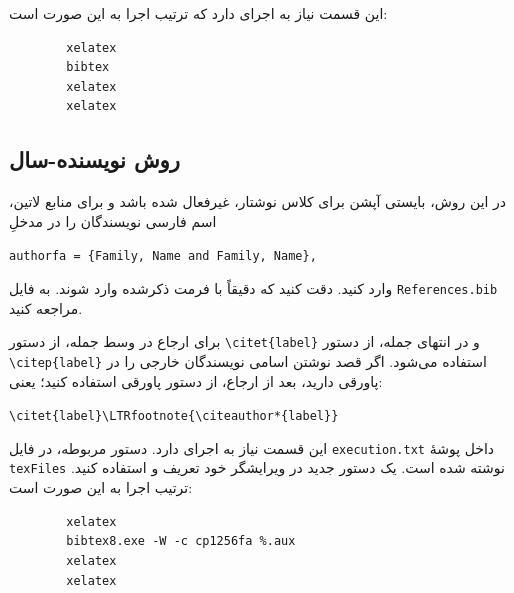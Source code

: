 این قسمت نیاز به اجرای
دارد که ترتیب اجرا به این صورت است:
\begin{latin}
	\begin{verbatim}
		xelatex
		bibtex
		xelatex
		xelatex
	\end{verbatim}
\end{latin}

\subsection{روش نویسنده-سال}
در این روش، بایستی آپشن
برای کلاس نوشتار، غیرفعال شده باشد و برای منابع لاتین، اسم فارسی نویسندگان را در مدخلِ
\begin{LTR}
	\verb|authorfa = {Family, Name and Family, Name},|
\end{LTR}\noindent
وارد کنید. دقت کنید که دقیقاً با فرمت ذکرشده وارد شوند. به فایل
\verb|References.bib|
مراجعه کنید.

برای ارجاع در وسط جمله، از دستور
\verb|\citet{label}|
و در انتهای جمله، از دستور
\verb|\citep{label}|
استفاده می‌شود. اگر قصد نوشتن اسامی نویسندگان خارجی را در پاورقی دارید،
بعد از ارجاع، از دستور پاورقی استفاده کنید؛ یعنی:
\begin{LTR}
	\verb|\citet{label}\LTRfootnote{\citeauthor*{label}}|
\end{LTR}

این قسمت نیاز به اجرای
دارد. دستور مربوطه، در فایل
\verb|execution.txt|
داخل پوشهٔ
\verb|texFiles|
نوشته شده است. یک دستور جدید در ویرایشگر خود تعریف و استفاده کنید. ترتیب اجرا به این صورت است:
\begin{latin}
	\begin{verbatim}
		xelatex
		bibtex8.exe -W -c cp1256fa %.aux
		xelatex
		xelatex
	\end{verbatim}
\end{latin}
\begin{RefBox}
	\vskip0pt
\end{RefBox}